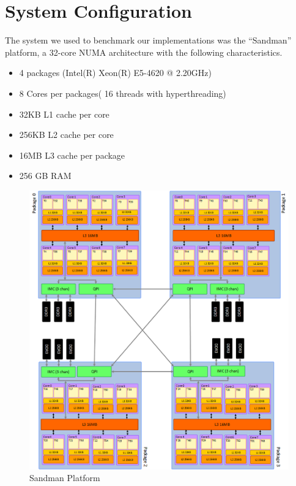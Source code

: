 

\section{System Configuration}

The system we used to benchmark our implementations was the “Sandman” platform, a 32-core NUMA architecture with the following  characteristics.

\begin{itemize}
\item 4 packages (Intel(R) Xeon(R) E5-4620 @ 2.20GHz)
\item 8 Cores per packages( 16 threads with hyperthreading)
\item 32KB L1 cache per core
\item 256KB L2 cache per core
\item 16MB L3 cache per package
\item 256 GB RAM 
\end{itemize}

\begin{figure} 
 \centering 
  \includegraphics[scale=0.5]{sandman_architecture.png} 
\caption{Sandman Platform} 
\label{sandman_architecture} 
\end{figure} 
